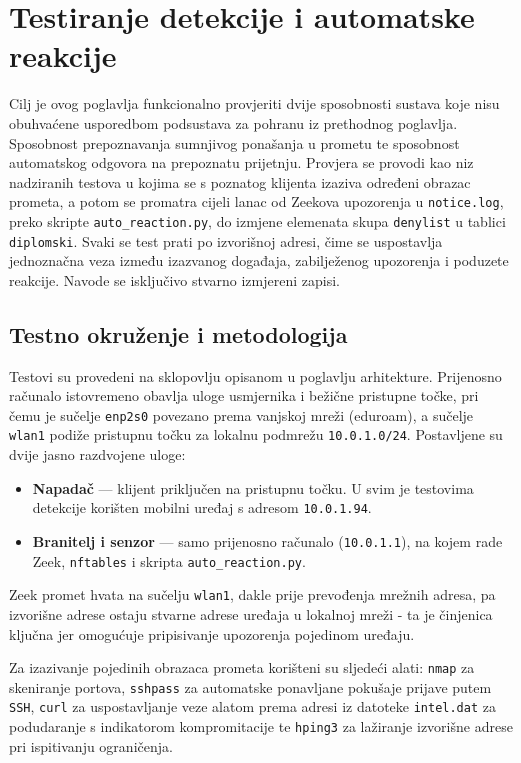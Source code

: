\chapter{Testiranje detekcije i \mbox{automatske} reakcije}

Cilj je ovog poglavlja funkcionalno provjeriti dvije sposobnosti sustava koje nisu obuhvaćene usporedbom podsustava za pohranu iz prethodnog poglavlja.
Sposobnost prepoznavanja sumnjivog ponašanja u prometu te sposobnost automatskog odgovora na prepoznatu prijetnju. Provjera se provodi kao niz
nadziranih testova u kojima se s poznatog klijenta izaziva određeni obrazac prometa, a potom se promatra cijeli lanac od Zeekova upozorenja u
\texttt{notice.log}, preko skripte \texttt{auto\_reaction.py}, do izmjene elemenata skupa \texttt{denylist} u tablici \texttt{diplomski}. Svaki se test
prati po izvorišnoj adresi, čime se uspostavlja jednoznačna veza između izazvanog događaja, zabilježenog upozorenja i poduzete reakcije. Navode se
isključivo stvarno izmjereni zapisi.

\section{Testno okruženje i metodologija}

Testovi su provedeni na sklopovlju opisanom u poglavlju arhitekture. Prijenosno računalo istovremeno obavlja uloge usmjernika i bežične pristupne točke, pri
čemu je sučelje \texttt{enp2s0} povezano prema vanjskoj mreži (eduroam), a sučelje \texttt{wlan1} podiže pristupnu točku za lokalnu podmrežu
\texttt{10.0.1.0/24}. Postavljene su dvije jasno razdvojene uloge:

\begin{itemize}
\item \textbf{Napadač} --- klijent priključen na pristupnu točku. U svim je
testovima detekcije korišten mobilni uređaj s adresom \texttt{10.0.1.94}.
\item \textbf{Branitelj i senzor} --- samo prijenosno računalo
(\texttt{10.0.1.1}), na kojem rade Zeek, \texttt{nftables} i skripta
\texttt{auto\_reaction.py}.
\end{itemize}

Zeek promet hvata na sučelju \texttt{wlan1}, dakle prije prevođenja mrežnih adresa, pa izvorišne adrese ostaju stvarne adrese uređaja u lokalnoj mreži - ta
je činjenica ključna jer omogućuje pripisivanje upozorenja pojedinom uređaju. 

Za izazivanje pojedinih obrazaca prometa korišteni su sljedeći alati: \texttt{nmap} za skeniranje portova, \texttt{sshpass} za automatske ponavljane pokušaje
prijave putem \texttt{SSH}, \texttt{curl} za uspostavljanje veze alatom prema adresi iz datoteke \texttt{intel.dat} za podudaranje
s indikatorom kompromitacije te \texttt{hping3} za lažiranje izvorišne adrese pri ispitivanju ograničenja.

